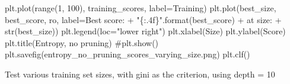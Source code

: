 \documentclass[
  letterpaper,
  DIV=11,
  numbers=noendperiod]{scrartcl}
\newenvironment{Shaded}{\begin{snugshade}}{\end{snugshade}}
\newcommand{\BuiltInTok}[1]{\textcolor[rgb]{0.00,0.23,0.31}{#1}}
\newcommand{\CommentTok}[1]{\textcolor[rgb]{0.37,0.37,0.37}{#1}}
\newcommand{\DecValTok}[1]{\textcolor[rgb]{0.68,0.00,0.00}{#1}}
\newcommand{\NormalTok}[1]{\textcolor[rgb]{0.00,0.23,0.31}{#1}}
\newcommand{\OperatorTok}[1]{\textcolor[rgb]{0.37,0.37,0.37}{#1}}
\newcommand{\SpecialCharTok}[1]{\textcolor[rgb]{0.37,0.37,0.37}{#1}}
\newcommand{\StringTok}[1]{\textcolor[rgb]{0.13,0.47,0.30}{#1}}
\begin{document}
\begin{Shaded}
\begin{Highlighting}[]
\NormalTok{    plt.plot(}\BuiltInTok{range}\NormalTok{(}\DecValTok{1}\NormalTok{, }\DecValTok{100}\NormalTok{), training\_scores, label}\OperatorTok{=}\StringTok{\textquotesingle{}Training\textquotesingle{}}\NormalTok{)}
\NormalTok{    plt.plot(best\_size, best\_score, }\StringTok{\textquotesingle{}ro\textquotesingle{}}\NormalTok{, label}\OperatorTok{=}\StringTok{\textquotesingle{}Best score: \textquotesingle{}}
         \OperatorTok{+} \StringTok{"}\SpecialCharTok{\{:.4f\}}\StringTok{"}\NormalTok{.}\BuiltInTok{format}\NormalTok{(best\_score) }\OperatorTok{+} \StringTok{\textquotesingle{} at size: \textquotesingle{}} \OperatorTok{+} \BuiltInTok{str}\NormalTok{(best\_size))}
\NormalTok{    plt.legend(loc}\OperatorTok{=}\StringTok{"lower right"}\NormalTok{)}
\NormalTok{    plt.xlabel(}\StringTok{\textquotesingle{}Size\textquotesingle{}}\NormalTok{)}
\NormalTok{    plt.ylabel(}\StringTok{\textquotesingle{}Score\textquotesingle{}}\NormalTok{)}
\NormalTok{    plt.title(}\StringTok{\textquotesingle{}Entropy, no pruning\textquotesingle{}}\NormalTok{)}
    \CommentTok{\#plt.show()}
\NormalTok{    plt.savefig(}\StringTok{\textquotesingle{}entropy\_no\_pruning\_scores\_varying\_size.png\textquotesingle{}}\NormalTok{)}
\NormalTok{    plt.clf()}

\CommentTok{\textquotesingle{}\textquotesingle{}\textquotesingle{}Test various training set sizes, with gini as the criterion, using depth = 10\textquotesingle{}\textquotesingle{}\textquotesingle{}}


\end{Highlighting}
\end{Shaded}
\end{document}
